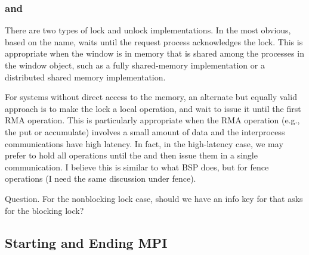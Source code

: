 \documentclass{article}
\begin{document}
\subsubsection{}

\subsubsection{ and }
There are two types of lock and unlock implementations.  In the most
obvious, based on the name,  waits until the
request process acknowledges the lock. This is appropriate when the
window is in memory that is shared among the processes in the window
object, such as a fully shared-memory implementation or a distributed
shared memory implementation.

For systems without direct access to the memory, an alternate but
equally valid approach is to make the lock a local operation, and wait
to issue it until the first RMA operation.  This is particularly
appropriate when the RMA operation (e.g., the put or accumulate)
involves a small amount of data and the interprocess communications
have high latency.  In fact, in the high-latency case, we may prefer
to hold all operations until the  and then issue
them in a single communication.  I believe this is similar to what BSP
does, but for fence operations (I need the same discussion under fence).

Question.  For the nonblocking lock case, should we have an info key
for  that asks for the blocking lock?  

\subsubsection{}
\subsubsection{}
\subsubsection{}
\subsubsection{}

\subsection{Starting and Ending MPI}
\end{document}
